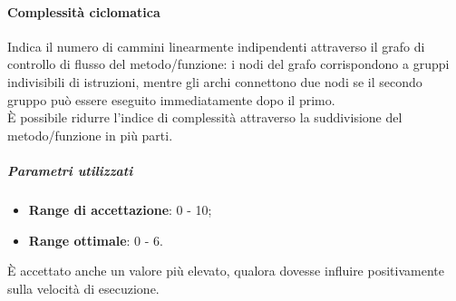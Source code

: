 \documentclass[../PianoDiQualifica.tex]{subfiles}
\begin{document}
				\paragraph{Complessità ciclomatica\\}
					Indica il numero di cammini linearmente indipendenti attraverso il
					grafo di controllo di flusso del metodo/funzione: i nodi del grafo
					corrispondono a gruppi indivisibili di istruzioni, mentre gli archi
					connettono due nodi se il secondo gruppo può essere eseguito
					immediatamente dopo il primo.\\
					È possibile ridurre l'indice di complessità attraverso la
					suddivisione del metodo/funzione in più parti.
					\subparagraph{Parametri utilizzati}
						\begin{itemize}
							\item \textbf{Range di accettazione}: 0 - 10;
							\item \textbf{Range ottimale}: 0 - 6.
						\end{itemize}
						\par È accettato anche un valore più elevato, qualora
						dovesse influire positivamente sulla velocità di esecuzione.
\end{document}
